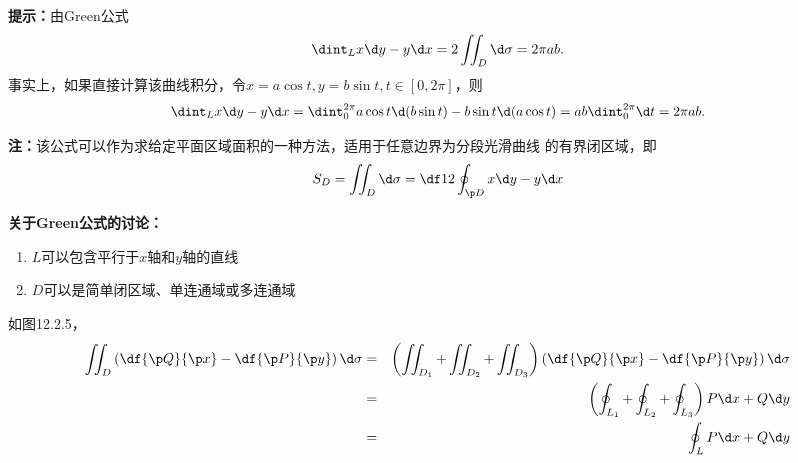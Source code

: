 {\bf 提示：}由Green公式
$$\dint_Lx\d y-y\d x=2\iint_D\d\sigma=2\pi ab.$$
事实上，如果直接计算该曲线积分，令$x=a\cos t,y=b\sin t,t\in[0,2\pi]$，则
$$\dint_Lx\d y-y\d x=\dint_0^{2\pi}a\cos t\d(b\sin t)
-b\sin t\d(a\cos t)=ab\dint_0^{2\pi}\d t=2\pi ab.$$

{\bf 注：}该公式可以作为求给定平面区域面积的一种方法，适用于任意边界为分段光滑曲线
的有界闭区域，即
$$S_D=\iint_D\d\sigma=\df12\oint_{\p D}x\d y-y\d x$$

{\bf 关于Green公式的讨论：}
\begin{enumerate}[(1)]
  \setlength{\itemindent}{1cm}
  \item $L$可以包含平行于$x$轴和$y$轴的直线
  \item $D$可以是简单闭区域、单连通域或多连通域
\end{enumerate}

\begin{center}
\end{center}

如图12.2.5，
\begin{eqnarray*}
	\iint_D\left(\df{\p Q}{\p x}-\df{\p P}{\p y}\right)\d\sigma&=&
	\left(\iint_{D_1}+\iint_{D_2}+\iint_{D_3}\right)\left(\df{\p Q}{\p x}-\df{\p
	P}{\p y}\right)\d\sigma\\
	&=&\left(\oint_{L_1}+\oint_{L_2}+\oint_{L_3}\right)P\d x+Q\d y\\
	&=&\oint_LP\d x+Q\d y
\end{eqnarray*}

